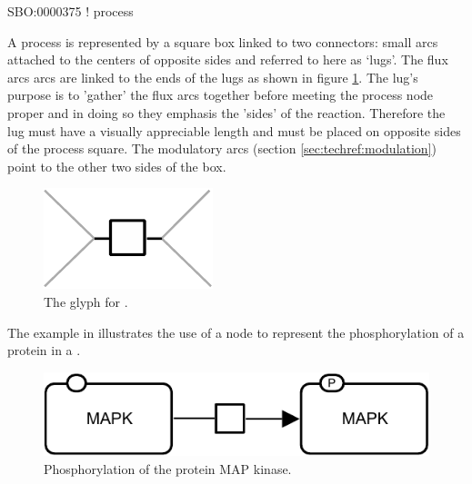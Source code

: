 \begin{glyphDescription}

\glyphSboTerm SBO:0000375 ! process

\glyphNode A process is represented by a square box linked to two
connectors: small arcs attached to the centers of opposite sides and
referred to here as `lugs'. The
flux arcs arcs are linked to the ends of the lugs as shown in figure
\ref{fig:techref:process}. The lug's purpose is to 'gather' the flux arcs
together before meeting the process node proper and in doing so they
emphasis the 'sides' of the reaction. Therefore the lug must have a
visually appreciable length and must be placed on opposite sides
of the process square. The modulatory arcs (section
\ref{sec:techref:modulation}) point to the other two sides of the box.

\end{glyphDescription}

\begin{figure}[htb]
  \centering
  \includegraphics[scale = 0.4]{images/process}
  \caption{The \PD glyph for .}
  \label{fig:techref:process}
\end{figure}


The example in  illustrates the use of a  node to represent the phosphorylation of a protein in a \PD.

\begin{figure}[htb]
  \centering
  \includegraphics[scale = 0.3]{examples/process-phosphorylation}
  \caption{Phosphorylation of the protein MAP kinase.}
  \label{fig:techref:trans-phos}
\end{figure}

